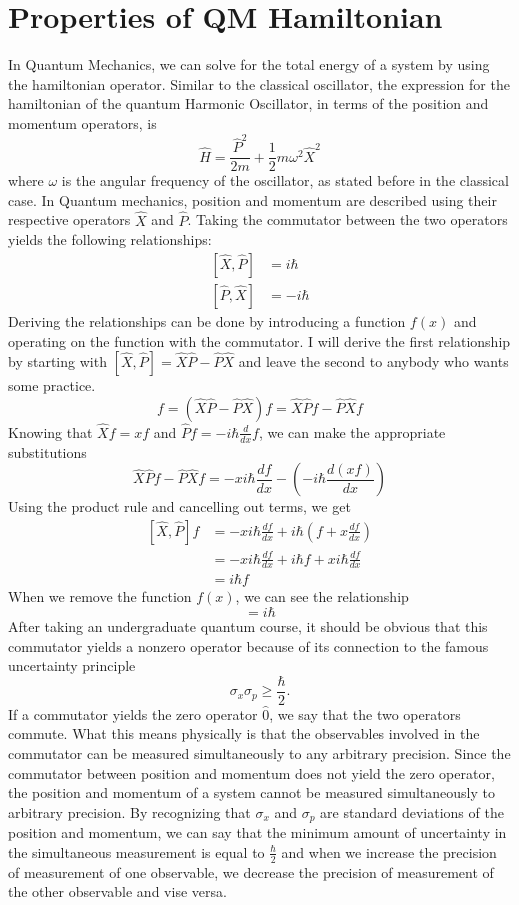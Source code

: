 \documentclass{article}
\newcommand{\be}{\begin{equation}}
\newcommand{\ee}{\end{equation}}
\begin{document}
\section{Properties of QM Hamiltonian}
In Quantum Mechanics, we can solve for the total energy of a system by using the hamiltonian operator. Similar to the classical oscillator, the expression for the hamiltonian of
the quantum Harmonic Oscillator, in terms of the position and momentum operators, is
\be
\hat{H}=\frac{\hat{P}^2}{2m} + \frac{1}{2}m\omega^2 \hat{X}^2
\ee
where $\omega$ is the angular frequency of the oscillator, as stated before in the classical case.
In Quantum mechanics, position and momentum are described using their respective operators $\hat{X}$ and $\hat{P}$.
Taking the commutator between the two operators yields the following relationships:
\be
\begin{split}
[\hat{X},\hat{P}] &= i \hbar \\
[\hat{P},\hat{X}] &= - i \hbar
\end{split}
\ee
Deriving the relationships can be done by introducing a function $f(x)$ and operating on the function with the commutator.
I will derive the first relationship by starting with $[\hat{X},\hat{P}] = \hat{X}\hat{P} - \hat{P}\hat{X}$ and leave the second to anybody who wants some practice.
\be
[\hat{X},\hat{P}]f = (\hat{X} \hat{P} - \hat{P} \hat{X})f = \hat{X} \hat{P}f - \hat{P} \hat{X}f
\ee
Knowing that $\hat{X}f = x f$ and $\hat{P}f = - i \hbar \frac{d}{dx} f$, we can make the appropriate substitutions
\be
\hat{X} \hat{P}f - \hat{P} \hat{X}f = - x i \hbar \frac{df}{dx} - (- i \hbar \frac{d(xf)}{dx})
\ee
Using the product rule and cancelling out terms, we get
\be
\begin{split}
[\hat{X},\hat{P}]f &= - x i \hbar \frac{df}{dx} + i \hbar(f + x \frac{df}{dx}) \\
&= - x i \hbar \frac{df}{dx} + i \hbar f + x i \hbar \frac{df}{dx} \\
&= i \hbar f
\end{split}
\ee
When we remove the function $f(x)$, we can see the relationship
\be
[\hat{X},\hat{P}]= i \hbar
\ee
After taking an undergraduate quantum course, it should be obvious that this commutator yields a nonzero operator because of its connection to the famous uncertainty principle
\be
\sigma_x \sigma_p \geq \frac{\hbar}{2}.
\ee
If a commutator yields the zero operator $\hat{0}$, we say that the two operators commute. What this means physically is that the observables involved in the commutator
can be measured simultaneously to any arbitrary precision. Since the commutator between position and momentum does not yield the zero operator, the position and momentum of a
system cannot be measured simultaneously to arbitrary precision. By recognizing that $\sigma_x$ and $\sigma_p$ are standard deviations of the position and momentum, we can say that
the minimum amount of uncertainty in the simultaneous measurement is equal to $\frac{\hbar}{2}$ and when we increase the precision of measurement of one observable, we decrease the
precision of measurement of the other observable and vise versa.
\end{document}
